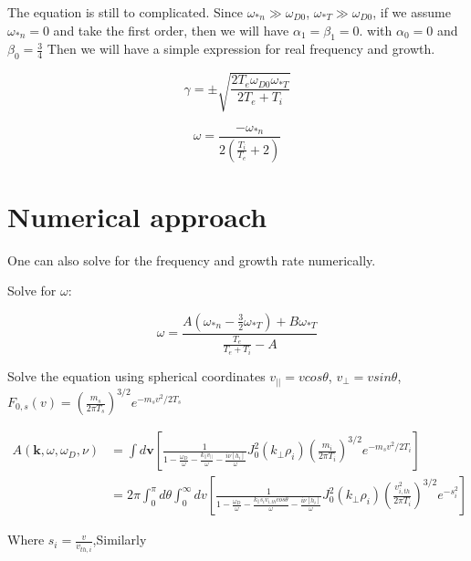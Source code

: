     The equation is still to complicated. Since $\omega_{*n}\gg \omega_{D0}$, $\omega_{*T}\gg \omega_{D0}$, if we assume $\omega_{*n}=0$ and take the first order, then we will have $\alpha_1=\beta_1=0$. with $\alpha_0=0 $ and $\beta_0=\frac{3}{4} $ Then we will have a simple expression for real frequency and growth.
    
    \begin{equation}
        \gamma=\pm \sqrt{\frac{2T_e\omega_{D0}\omega_{*T}}{2T_e+T_i}}
    \end{equation}
    
    
    \begin{equation}
        \omega=\frac{-\omega_{*n}}{2(\frac{T_i}{T_e}+2)}
    \end{equation}
    
    
    


\section{Numerical approach}

One can also solve for the frequency and growth rate numerically. 

Solve for $\omega$:

\begin{equation}
    \omega = \frac{A(\omega_{*n}-\frac{3}{2}\omega_{*T})+B\omega_{*T}}{\frac{ T_e}{T_e+T_i}-A}
\end{equation}

Solve the equation using spherical coordinates $v_{||}=vcos\theta$, $v_{\perp}=vsin\theta$, $F_{0,s}(v)=\left(\frac{m_s}{2\pi T_s}\right)^{3/2}e^{-m_sv^2/2T_s}$

\begin{equation}
    \begin{aligned}
    A(\textbf{k},\omega, \omega_D ,\nu){}&=
\int d\textbf{v} \left[
\frac{1 
    }{1 -\frac{\omega_D }{\omega}
    - \frac{k_{||}v_{||}}{\omega}-\frac{i\nu[h_i]}{\omega}}J_0^2(k_\perp\rho_i)\left(\frac{m_i}{2\pi T_i}\right)^{3/2}e^{-m_sv^2/2T_i}
 \right]\\
 &=
2\pi \int^\pi_0 d\theta \int ^\infty _0 dv \left[
\frac{1 
    }{1 -\frac{\omega_D }{\omega}
    - \frac{k_{||}s_iv_{i,th}cos\theta}{\omega}-\frac{i\nu[h_i]}{\omega}}J_0^2(k_\perp\rho_i)\left(\frac{v^2_{i,th}}{2\pi T_i}\right)^{3/2}e^{-s_i^2
    }
 \right]
    \end{aligned}
\end{equation}

Where $s_i=\frac{v}{v_{th,i}}$,Similarly

